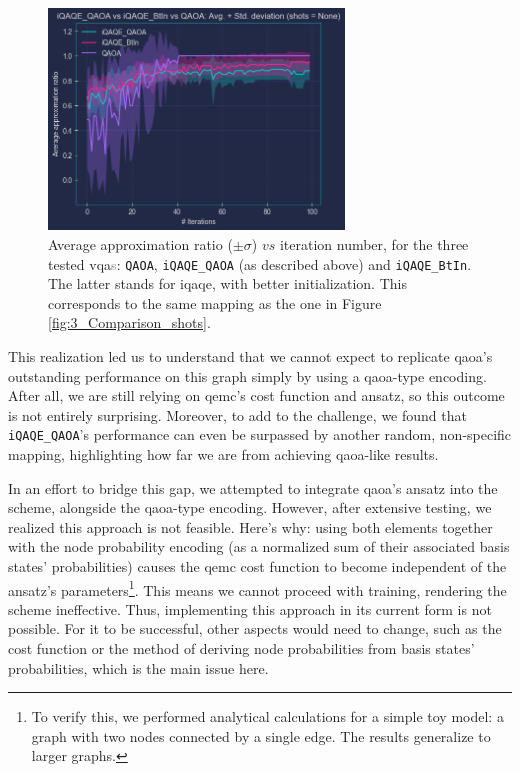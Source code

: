 \begin{figure}[H]
  \centering
  \includegraphics[width=0.70\textwidth]{Figures/Chapter_5/iQAQE_QAOA.png}
  \caption{Average approximation ratio ($\pm \sigma$) $vs$ iteration number, for the three tested \acrshort{vqa}\textcolor{gray}{s}: \texttt{QAOA}, \texttt{iQAQE\_QAOA} (as described above) and \texttt{iQAQE\_BtIn}. The latter stands for \acrshort{iqaqe}, with better initialization. This corresponds to the same mapping as the one in Figure \ref{fig:3_Comparison_shots}.}
  \label{fig:iQAQE_QAOA}
\end{figure}

This realization led us to understand that we cannot expect to replicate \acrshort{qaoa}'s outstanding performance on this graph simply by using a \acrshort{qaoa}-type encoding. After all, we are still relying on \acrshort{qemc}'s cost function and ansatz, so this outcome is not entirely surprising. Moreover, to add to the challenge, we found that \texttt{iQAQE\_QAOA}'s performance can even be surpassed by another random, non-specific mapping, highlighting how far we are from achieving \acrshort{qaoa}-like results.

In an effort to bridge this gap, we attempted to integrate \acrshort{qaoa}'s ansatz into the scheme, alongside the \acrshort{qaoa}-type encoding. However, after extensive testing, we realized this approach is not feasible. Here's why: using both elements together with the node probability encoding (as a normalized sum of their associated basis states' probabilities) causes the \acrshort{qemc} cost function to become independent of the ansatz's parameters\footnote{To verify this, we performed analytical calculations for a simple toy model: a graph with two nodes connected by a single edge. The results generalize to larger graphs.}. This means we cannot proceed with training, rendering the scheme ineffective. Thus, implementing this approach in its current form is not possible. For it to be successful, other aspects would need to change, such as the cost function or the method of deriving node probabilities from basis states' probabilities, which is the main issue here.









